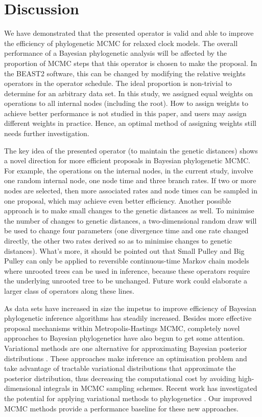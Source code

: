 \documentclass{bmcart}
\begin{document}
\section*{Discussion}
We have demonstrated that the presented operator is valid and able to improve the efficiency of phylogenetic MCMC for relaxed clock models. The overall performance of a Bayesian phylogenetic analysis will be affected by the proportion of MCMC steps that this operator is chosen to make the proposal. In the BEAST2 software, this can be changed by modifying the relative weights operators in the operator schedule. The ideal proportion is non-trivial to determine for an arbitrary data set. In this study, we assigned equal weights on operations to all internal nodes (including the root). How to assign weights to achieve better performance is not studied in this paper, and users may assign different weights in practice. Hence, an optimal method of assigning weights still needs further investigation. 

The key idea of the presented operator (to maintain the genetic distances) shows a novel direction for more efficient proposals in Bayesian phylogenetic MCMC. For example, the operations on the internal nodes, in the current study, involve one random internal node, one node time and three branch rates. If two or more nodes are selected, then more associated rates and node times can be sampled in one proposal, which may achieve even better efficiency. Another possible approach is to make small changes to the genetic distances as well. To minimise the number of changes to genetic distances, a two-dimensional random draw will be used to change four parameters (one divergence time and one rate changed directly, the other two rates derived so as to minimise changes to genetic distances). What's more, it should be pointed out that Small Pulley and Big Pulley can only be applied to reversible continuous-time Markov chain models where unrooted trees can be used in inference, because these operators require the underlying unrooted tree to be unchanged. Future work could elaborate a larger class of operators along these lines.

As data sets have increased in size the impetus to improve efficiency of Bayesian phylogenetic inference algorithms has steadily increased. Besides more effective proposal mechanisms within Metropolis-Hastings MCMC, completely novel approaches to Bayesian phylogenetics have also begun to get some attention. Variational methods are one alternative for approximating Bayesian posterior distributions \cite{beal2003variational}. These approaches make inference an optimisation problem and take advantage of tractable variational distributions that approximate the posterior distribution, thus decreasing the computational cost by avoiding high-dimensional integrals in MCMC sampling schemes. Recent work has investigated the potential for applying variational methods to phylogenetics \cite{zhang2018variational,dang2019stochastic}. Our improved MCMC methods provide a performance baseline for these new approaches.
\end{document}

